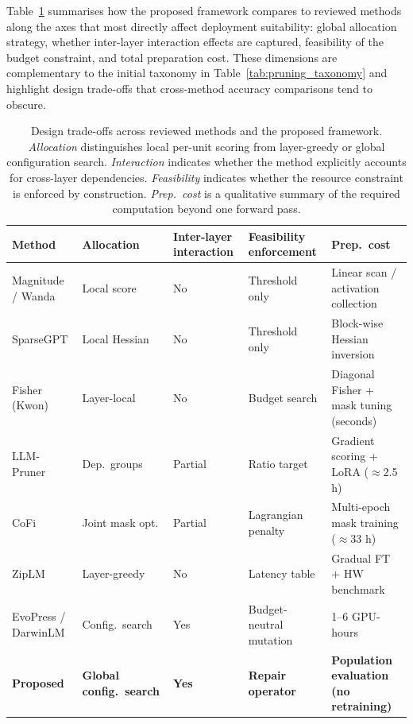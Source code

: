 Table~\ref{tab:design_comparison} summarises how the proposed framework compares to reviewed methods along the axes that most directly affect deployment suitability: global allocation strategy, whether inter-layer interaction effects are captured, feasibility of the budget constraint, and total preparation cost. These dimensions are complementary to the initial taxonomy in Table~\ref{tab:pruning_taxonomy} and highlight design trade-offs that cross-method accuracy comparisons tend to obscure.

\begin{table}[H]
  \centering
  \caption{Design trade-offs across reviewed methods and the proposed framework.
    \emph{Allocation} distinguishes local per-unit scoring from layer-greedy or global configuration search.
    \emph{Interaction} indicates whether the method explicitly accounts for cross-layer dependencies.
    \emph{Feasibility} indicates whether the resource constraint is enforced by construction.
    \emph{Prep.\ cost} is a qualitative summary of the required computation beyond one forward pass.}
  \label{tab:design_comparison}
  \begin{tabular}{@{}p{2.8cm} p{2.5cm} p{1.5cm} p{1.8cm} p{3.2cm}@{}}
    \toprule
    \textbf{Method} & \textbf{Allocation} & \textbf{Inter-layer interaction} & \textbf{Feasibility enforcement} & \textbf{Prep.\ cost} \\
    \midrule
    Magnitude / Wanda    & Local score       & No  & Threshold only & Linear scan / activation collection \\
    SparseGPT            & Local Hessian     & No  & Threshold only & Block-wise Hessian inversion \\
    Fisher (Kwon)        & Layer-local       & No  & Budget search  & Diagonal Fisher + mask tuning (seconds) \\
    LLM-Pruner           & Dep.\ groups      & Partial & Ratio target & Gradient scoring + LoRA ($\approx$2.5 h) \\
    CoFi                 & Joint mask opt.   & Partial & Lagrangian penalty & Multi-epoch mask training ($\approx$33 h) \\
    ZipLM                & Layer-greedy      & No  & Latency table  & Gradual FT + HW benchmark \\
    EvoPress / DarwinLM  & Config.\ search   & Yes & Budget-neutral mutation & 1--6 GPU-hours \\
    \midrule
    \textbf{Proposed}    & \textbf{Global config.\ search} & \textbf{Yes} & \textbf{Repair operator} & \textbf{Population evaluation (no retraining)} \\
    \bottomrule
  \end{tabular}
\end{table}

